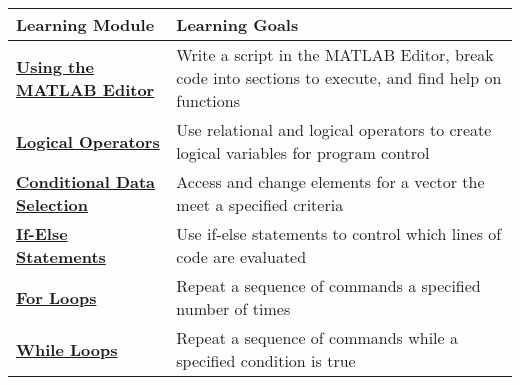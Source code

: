\documentclass[11pt]{article}
\begin{document}
\begin{longtable}[]{@{}ll@{}}
\toprule
\begin{minipage}[b]{0.29\columnwidth}\raggedright\strut
\textbf{Learning Module}\strut
\end{minipage} & \begin{minipage}[b]{0.29\columnwidth}\raggedright\strut
\textbf{Learning Goals}\strut
\end{minipage}\tabularnewline
\midrule
\endhead
\begin{minipage}[t]{0.29\columnwidth}\raggedright\strut
\textbf{\href{http://youtu.be/TZr6GyxnI_w}{Using the MATLAB
Editor}}\strut
\end{minipage} & \begin{minipage}[t]{0.29\columnwidth}\raggedright\strut
Write a script in the MATLAB Editor, break code into sections to
execute, and find help on functions\strut
\end{minipage}\tabularnewline
\begin{minipage}[t]{0.29\columnwidth}\raggedright\strut
\textbf{\href{http://youtu.be/5gVKJVVmbrM}{Logical Operators}}\strut
\end{minipage} & \begin{minipage}[t]{0.29\columnwidth}\raggedright\strut
Use relational and logical operators to create logical variables for
program control\strut
\end{minipage}\tabularnewline
\begin{minipage}[t]{0.29\columnwidth}\raggedright\strut
\textbf{\href{http://youtu.be/8wxh4LtT--g}{Conditional Data
Selection}}\strut
\end{minipage} & \begin{minipage}[t]{0.29\columnwidth}\raggedright\strut
Access and change elements for a vector the meet a specified
criteria\strut
\end{minipage}\tabularnewline
\begin{minipage}[t]{0.29\columnwidth}\raggedright\strut
\textbf{\href{http://youtu.be/oaK2-ZT9dls}{If-Else Statements}}\strut
\end{minipage} & \begin{minipage}[t]{0.29\columnwidth}\raggedright\strut
Use if-else statements to control which lines of code are
evaluated\strut
\end{minipage}\tabularnewline
\begin{minipage}[t]{0.29\columnwidth}\raggedright\strut
\textbf{\href{http://youtu.be/1u3RahlWEZA}{For Loops}}\strut
\end{minipage} & \begin{minipage}[t]{0.29\columnwidth}\raggedright\strut
Repeat a sequence of commands a specified number of times\strut
\end{minipage}\tabularnewline
\begin{minipage}[t]{0.29\columnwidth}\raggedright\strut
\textbf{\href{http://youtu.be/dofj51Ovdl4}{While Loops}}\strut
\end{minipage} & \begin{minipage}[t]{0.29\columnwidth}\raggedright\strut
Repeat a sequence of commands while a specified condition is true\strut
\end{minipage}\tabularnewline
\bottomrule
\end{longtable}
\end{document}
